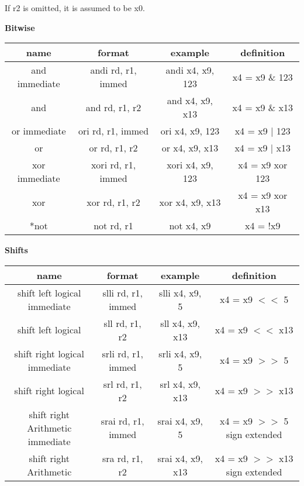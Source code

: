 \documentclass{article}
\begin{document}
\begin{center}
  If r2 is omitted, it is assumed to be x0.

    \textbf{Bitwise}

  \begin{tabular}{|c|c|c|c|}
    \hline
    name          & format             & example          & definition        \\
    \hline
    and immediate & andi rd, r1, immed & andi x4, x9, 123 & x4 = x9 \& 123    \\
    and           & and rd, r1, r2     & and x4, x9, x13  & x4 = x9 \& x13    \\
    or immediate  & ori rd, r1, immed  & ori x4, x9, 123  & x4 = x9 \(|\) 123 \\
    or            & or rd, r1, r2      & or x4, x9, x13   & x4 = x9 \(|\) x13 \\
    xor immediate & xori rd, r1, immed & xori x4, x9, 123 & x4 = x9 xor 123   \\
    xor           & xor rd, r1, r2     & xor x4, x9, x13  & x4 = x9 xor x13   \\
    *not   & not rd, r1         & not x4, x9       & x4 = !x9          \\
    \hline
  \end{tabular}



  \textbf{Shifts}

  \begin{tabular}{|c|c|c|c|}
    \hline
    name                             & format             & example          & definition       \\
    \hline
    shift left logical immediate     & slli rd, r1, immed & slli x4, x9, 5   & x4 = x9
    $<<$ 5                                                                                      \\
    shift left logical               & sll rd, r1, r2     & sll x4, x9, x13  & x4 = x9 $<<$ x13 \\
    shift right logical immediate    & srli rd, r1, immed & srli x4, x9, 5   & x4 =
    x9 $>>$ 5                                                                                   \\
    shift right logical              & srl rd, r1, r2     & srl x4, x9, x13  & x4 = x9 $>>$ x13 \\
    shift right Arithmetic immediate & srai rd, r1, immed & srai x4, x9, 5   & x4
    = x9
    $>>$ 5 sign extended                                                                        \\
    shift right Arithmetic           & sra rd, r1, r2     & srai x4, x9, x13 & x4
    = x9 $>>$ x13 sign extended                                                                 \\
    \hline
  \end{tabular}


\end{center}
\end{document}
